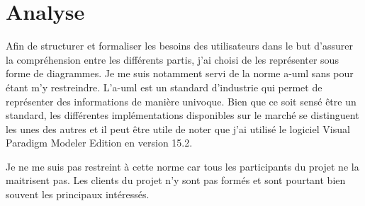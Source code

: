 \chapter{Analyse}
\label{ch:analysis}

Afin de structurer et formaliser les besoins des utilisateurs dans le but d'assurer la compréhension entre les différents partis, j'ai choisi de les représenter sous forme de diagrammes.
Je me suis notamment servi de la norme \gls{a-uml} sans pour étant m'y restreindre.
L'\gls{a-uml} est un standard d'industrie qui permet de représenter des informations de manière univoque.
Bien que ce soit sensé être un standard, les différentes implémentations disponibles sur le marché se distinguent les unes des autres et il peut être utile de noter que j'ai utilisé le logiciel \guillemotleft{} Visual Paradigm Modeler Edition \guillemotright{} en version 15.2.

Je ne me suis pas restreint à cette norme car tous les participants du projet ne la maitrisent pas.
Les clients du projet n'y sont pas formés et sont pourtant bien souvent les principaux intéressés.





